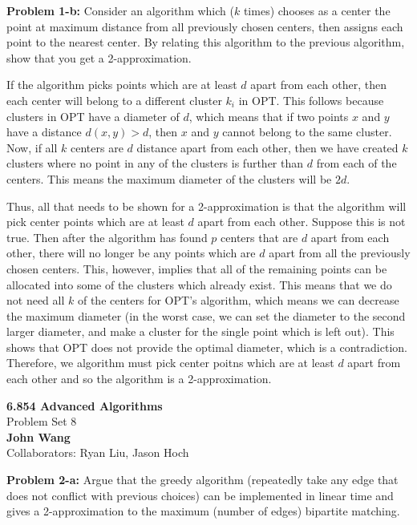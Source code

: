 \documentclass[psamsfonts]{amsart}
\newenvironment{sol}{\vspace{0.25cm}{\large \bfseries Solution:}}{\qedsymbol}
\newenvironment{prob}[1]{\begin{framed}{\large \bfseries Problem #1:}}{\end{framed}}
\newcommand{\makenewtitle}{
    \begin{center}
    {\huge \bfseries 6.854 Advanced Algorithms} \\
    Problem Set 8\\
    \vspace{0.25cm}
    {\bfseries John Wang} \\
    Collaborators: Ryan Liu, Jason Hoch 
    \end{center}
    \vspace{0.5cm}
}
\begin{document}
\begin{prob}{1-b}
Consider an algorithm which ($k$ times) chooses as a center the point at maximum distance from all previously chosen centers, then assigns each point to the nearest center. By relating this algorithm to the previous algorithm, show that you get a 2-approximation.
\end{prob}
\begin{sol}
If the algorithm picks points which are at least $d$ apart from each other, then each center will belong to a different cluster $k_i$ in OPT. This follows because clusters in OPT have a diameter of $d$, which means that if two points $x$ and $y$ have a distance $d(x,y) > d$, then $x$ and $y$ cannot belong to the same cluster. Now, if all $k$ centers are $d$ distance apart from each other, then we have created $k$ clusters where no point in any of the clusters is further than $d$ from each of the centers. This means the maximum diameter of the clusters will be $2d$.

Thus, all that needs to be shown for a 2-approximation is that the algorithm will pick center points which are at least $d$ apart from each other. Suppose this is not true. Then after the algorithm has found $p$ centers that are $d$ apart from each other, there will no longer be any points which are $d$ apart from all the previously chosen centers. This, however, implies that all of the remaining points can be allocated into some of the clusters which already exist. This means that we do not need all $k$ of the centers for OPT's algorithm, which means we can decrease the maximum diameter (in the worst case, we can set the diameter to the second larger diameter, and make a cluster for the single point which is left out). This shows that OPT does not provide the optimal diameter, which is a contradiction. Therefore, we algorithm must pick center poitns which are at least $d$ apart from each other and so the algorithm is a 2-approximation.
\end{sol}

\newpage
\makenewtitle

\begin{prob}{2-a}
Argue that the greedy algorithm (repeatedly take any edge that does not conflict with previous choices) can be implemented in linear time and gives a 2-approximation to the maximum (number of edges) bipartite matching.
\end{prob}
\end{document}
